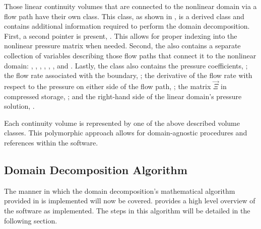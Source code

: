 Those linear continuity volumes that are connected to the nonlinear domain via a flow path have their own  class.
This class, as shown in , is a derived class and contains additional information required to perform the domain decomposition.
First, a second  pointer is present, .
This allows for proper indexing into the nonlinear pressure matrix when needed.
Second, the  also contains a separate collection of variables describing those flow paths that connect it to the nonlinear domain: , , , , , , and .
Lastly, the  class also contains the pressure coefficients, ; the flow rate associated with the boundary, ; the derivative of the flow rate with respect to the pressure on either side of the flow path, ; the matrix $\vec{\Xi}$ in compressed storage, ; and the right-hand side of the linear domain's pressure solution, .

Each continuity volume is represented by one of the above described volume classes.
This polymorphic approach allows for domain-agnostic procedures and references within the software.

\subsection{Domain Decomposition Algorithm}
\label{subsect:domDecompAlgorithm}

The manner in which the domain decomposition's mathematical algorithm provided in  is implemented will now be covered.
 provides a high level overview of the software as implemented.
The steps in this algorithm will be detailed in the following section.

